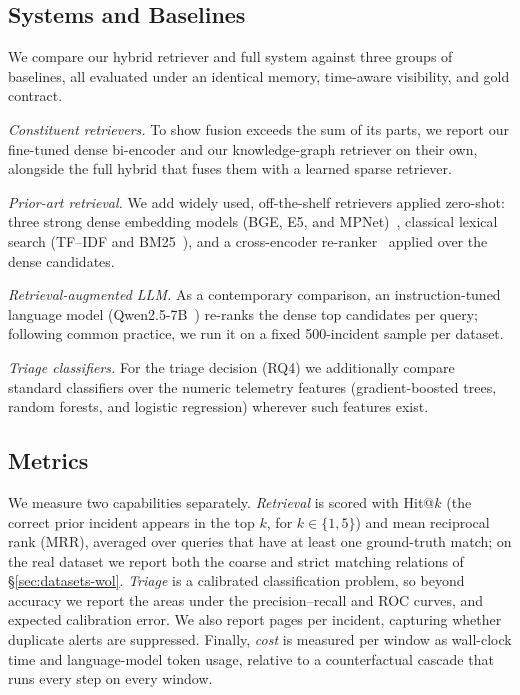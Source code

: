 \subsection{Systems and Baselines}
\label{sec:setup-baselines}

We compare our hybrid retriever and full system against three groups of baselines,
all evaluated under an identical memory, time-aware visibility, and gold contract.

\noindent\emph{Constituent retrievers.} To show fusion exceeds the sum of its parts, we report our fine-tuned dense
bi-encoder and our knowledge-graph retriever on their own, alongside the full
hybrid that fuses them with a learned sparse retriever.

\noindent\emph{Prior-art retrieval.} We add widely used, off-the-shelf retrievers
applied zero-shot: three strong dense embedding models (BGE, E5, and
MPNet)~\cite{xiao2024cpack,wang2022e5,song2020mpnet}, classical lexical search
(TF--IDF and BM25~\cite{robertson2009bm25}), and a cross-encoder
re-ranker~\cite{nogueira2019passage} applied over the dense candidates.

\noindent\emph{Retrieval-augmented LLM.} As a contemporary comparison,
an instruction-tuned language model (Qwen2.5-7B~\cite{qwen2024}) re-ranks the
dense top candidates per query; following common practice, we run it on a fixed
500-incident sample per dataset.

\noindent\emph{Triage classifiers.} For the triage decision (RQ4) we additionally
compare standard classifiers over the numeric telemetry features (gradient-boosted
trees, random forests, and logistic regression) wherever such features exist.

\subsection{Metrics}
\label{sec:setup-metrics}

We measure two capabilities separately. \emph{Retrieval} is scored with
Hit@$k$ (the correct prior incident appears in the top $k$, for
$k\in\{1,5\}$) and mean reciprocal rank (MRR), averaged over queries that have
at least one ground-truth match; on the real dataset we report both the coarse
and strict matching relations of \S\ref{sec:datasets-wol}. \emph{Triage} is a
calibrated classification problem, so beyond accuracy we report the areas under the precision--recall and ROC
curves, and expected calibration error. We also report pages per incident, capturing whether duplicate alerts are
suppressed. Finally,
\emph{cost} is measured per window as wall-clock time and language-model token
usage, relative to a counterfactual cascade that runs every step on every window.


